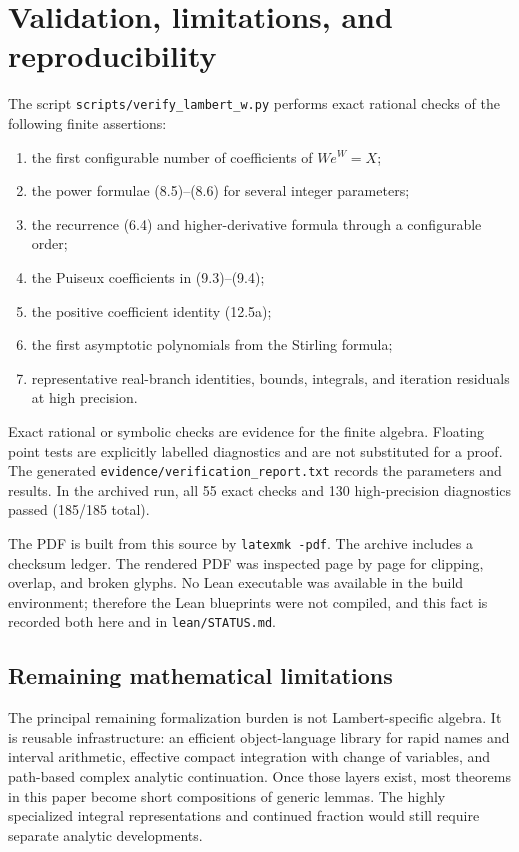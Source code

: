 \documentclass[11pt]{article}
\theoremstyle{definition}
\newcommand{\code}[1]{\nolinkurl{#1}}
\begin{document}
\section{Validation, limitations, and reproducibility}\label{sec:validation}

The script \code{scripts/verify\_lambert\_w.py} performs exact rational checks
of the following finite assertions:
\begin{enumerate}
\item the first configurable number of coefficients of
\(W e^W=X\);
\item the power formulae (8.5)--(8.6) for several integer parameters;
\item the recurrence (6.4) and higher-derivative formula through a configurable
order;
\item the Puiseux coefficients in (9.3)--(9.4);
\item the positive coefficient identity (12.5a);
\item the first asymptotic polynomials from the Stirling formula;
\item representative real-branch identities, bounds, integrals, and iteration
residuals at high precision.
\end{enumerate}
Exact rational or symbolic checks are evidence for the finite algebra.  Floating
point tests are explicitly labelled diagnostics and are not substituted for a
proof.  The generated \code{evidence/verification\_report.txt} records the
parameters and results.  In the archived run, all 55 exact checks and 130
high-precision diagnostics passed (185/185 total).

The PDF is built from this source by \code{latexmk -pdf}.  The archive includes
a checksum ledger.  The rendered PDF was inspected page by page for clipping,
overlap, and broken glyphs.  No Lean executable was available in the build
environment; therefore the Lean blueprints were not compiled, and this fact is
recorded both here and in \code{lean/STATUS.md}.

\subsection{Remaining mathematical limitations}

The principal remaining formalization burden is not Lambert-specific algebra.
It is reusable infrastructure: an efficient object-language library for rapid
names and interval arithmetic, effective compact integration with change of
variables, and path-based complex analytic continuation.  Once those layers
exist, most theorems in this paper become short compositions of generic lemmas.
The highly specialized integral representations and continued fraction would
still require separate analytic developments.
\end{document}
